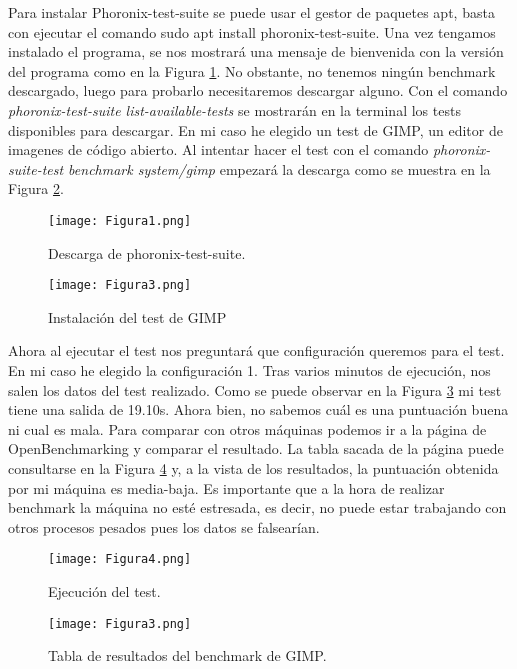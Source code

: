 Para instalar Phoronix-test-suite se puede usar el gestor de paquetes apt, basta con ejecutar el comando sudo apt install phoronix-test-suite.
Una vez tengamos instalado el programa, se nos mostrará una mensaje de bienvenida con la versión del programa como en la 
Figura \ref{fig:figura1}. No obstante, no tenemos ningún benchmark descargado, luego para probarlo necesitaremos descargar alguno.
Con el comando \textit{phoronix-test-suite list-available-tests} se mostrarán en la terminal los tests disponibles para descargar. En mi
caso he elegido un test de GIMP, un editor de imagenes de código abierto. Al intentar hacer el test con el comando 
\textit{phoronix-suite-test benchmark system/gimp} empezará la descarga como se muestra en la Figura \ref{fig:figura3}.

\begin{figure}[H] 
\centering
\texttt{[image: Figura1.png]}  
\caption{Descarga de phoronix-test-suite.}\label{fig:figura1}
\end{figure}
\begin{figure}[H] 
\centering
\texttt{[image: Figura3.png]}  
\caption{Instalación del test de GIMP}\label{fig:figura3}
\end{figure}

\vspace{5mm}

Ahora al ejecutar el test nos preguntará que configuración queremos para el test. En mi caso he elegido la configuración 1. Tras varios
minutos de ejecución, nos salen los datos del test realizado. Como se puede observar en la Figura \ref{fig:figura4} mi test tiene una
salida de 19.10s. Ahora bien, no sabemos cuál es una puntuación buena ni cual es mala. Para comparar con otros máquinas podemos ir
a la página de OpenBenchmarking\cite{gimpbm} y comparar el resultado. La tabla sacada de la página puede consultarse en la 
Figura \ref{fig:figura5} y, a la vista de los resultados, la puntuación obtenida por mi máquina es media-baja. Es importante que a la hora
de realizar benchmark la máquina no esté estresada, es decir, no puede estar trabajando con otros procesos pesados pues los datos se
falsearían.

\begin{figure}[H] 
\centering
\texttt{[image: Figura4.png]}  
\caption{Ejecución del test.}\label{fig:figura4}
\end{figure}
\begin{figure}[H] 
\centering
\texttt{[image: Figura3.png]}  
\caption{Tabla de resultados del benchmark de GIMP.}\label{fig:figura5}
\end{figure}


